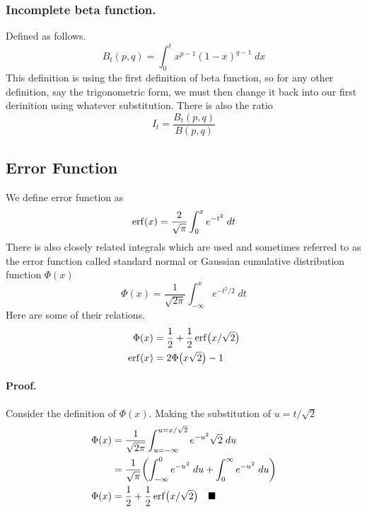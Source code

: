 \documentclass[../../main.tex]{subfiles}
\begin{document}
\subsubsection{Incomplete beta function.} Defined as follows.
\begin{equation*}
    B_t(p,q)=\int_{0}^{t}x^{p-1}(1-x)^{q-1}\;dx
\end{equation*}
This definition is using the first definition of beta function, so for any other definition, say the trigonometric form, we must then change it back into our first derinition using whatever substitution. There is also the ratio
\begin{equation*}
    I_t=\frac{B_t(p,q)}{B(p,q)}
\end{equation*}

\subsection{Error Function} We define error function as 
\begin{equation*}
    \operatorname{erf}(x)=\frac{2}{\sqrt{\pi}}\int_{0}^{x}e^{-t^2}\;dt
\end{equation*}
There is also closely related integrals which are used and sometimes referred to as the error function called standard normal or Gaussian cumulative distribution function $\Phi(x)$
\begin{equation*}
    \Phi(x)=\frac{1}{\sqrt{2\pi}}\int_{-\infty}^{x} e^{-t^2/2}\;dt
\end{equation*}
Here are some of their relations.
\begin{align*}
    \Phi(x)&=\frac{1}{2}+\frac{1}{2}\operatorname{erf}\bigl(x/\sqrt{2}\bigr)\\
    \operatorname{erf}(x)&=2\Phi\bigl(x\sqrt{2}\bigr)-1
\end{align*}

\paragraph{Proof.} Consider the definition of $\Phi(x)$. Making the substitution of $u=t/\sqrt{2}$
\begin{align*}
    \Phi(x)&=\frac{1}{\sqrt{2\pi}}\int_{u=-\infty}^{u=x/\sqrt{2}}e^{-u^2}\sqrt{2}\;du\\
    &=\frac{1}{\sqrt{\pi}} \biggl(\int_{-\infty}^{0}e^{-u^2}\;du+ \int_{0}^{\infty}e^{-u^2}\;du\biggr)\\
    \Phi(x)&=\frac{1}{2}+\frac{1}{2}\operatorname{erf}\bigl(x/\sqrt{2}\bigr)\quad\blacksquare
\end{align*}
\end{document}
